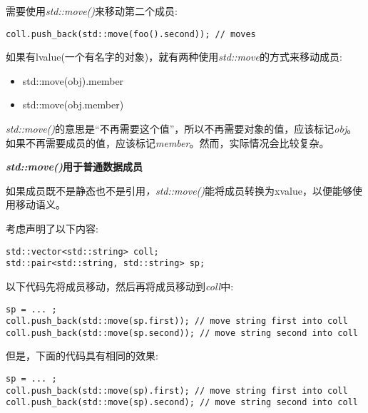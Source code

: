 需要使用\textit{std::move()}来移动第二个成员:\par

\begin{lstlisting}[caption={}]
coll.push_back(std::move(foo().second)); // moves
\end{lstlisting}

如果有lvalue(一个有名字的对象)，就有两种使用\textit{std::move}的方式来移动成员:\par

\begin{itemize}
	\item std::move(obj).member
	\item std::move(obj.member)
\end{itemize}

\textit{std::move()}的意思是“不再需要这个值”，所以不再需要对象的值，应该标记\textit{obj}。如果不再需要成员的值，应该标记\textit{member}。然而，实际情况会比较复杂。\par

\hspace*{\fill} \par %
\textbf{\textit{std::move()}用于普通数据成员}

如果成员既不是静态也不是引用\textit{，std::move()}能将成员转换为xvalue，以便能够使用移动语义。\par

考虑声明了以下内容:\par

\begin{lstlisting}[caption={}]
std::vector<std::string> coll;
std::pair<std::string, std::string> sp;
\end{lstlisting}

以下代码先将成员移动，然后再将成员移动到\textit{coll}中:\par

\begin{lstlisting}[caption={}]
sp = ... ;
coll.push_back(std::move(sp.first)); // move string first into coll
coll.push_back(std::move(sp.second)); // move string second into coll
\end{lstlisting}

但是，下面的代码具有相同的效果:\par

\begin{lstlisting}[caption={}]
sp = ... ;
coll.push_back(std::move(sp).first); // move string first into coll
coll.push_back(std::move(sp).second); // move string second into coll
\end{lstlisting}

